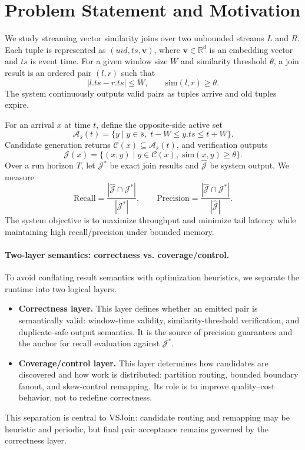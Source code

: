 \section{Problem Statement and Motivation}
\label{sec:problem-statement}

We study streaming vector similarity joins over two unbounded streams $L$ and $R$. Each tuple is represented as $(\mathit{uid}, \mathit{ts}, \mathbf{v})$, where $\mathbf{v} \in \mathbb{R}^d$ is an embedding vector and $\mathit{ts}$ is event time. For a given window size $W$ and similarity threshold $\theta$, a join result is an ordered pair $(l, r)$ such that
\[
|l.\mathit{ts} - r.\mathit{ts}| \leq W,
\qquad
\mathrm{sim}(l, r) \geq \theta.
\]
The system continuously outputs valid pairs as tuples arrive and old tuples expire.

For an arrival $x$ at time $t$, define the opposite-side active set
\[
\mathcal{A}_{\bar{s}}(t)=\{y \mid y\in \bar{s},\; t-W \leq y.\mathit{ts} \leq t+W\}.
\]
Candidate generation returns $\mathcal{C}(x)\subseteq\mathcal{A}_{\bar{s}}(t)$, and verification outputs
\[
\mathcal{J}(x)=\{(x,y)\mid y\in \mathcal{C}(x),\; \mathrm{sim}(x,y)\geq\theta\}.
\]
Over a run horizon $T$, let $\mathcal{J}^*$ be exact join results and $\widehat{\mathcal{J}}$ be system output. We measure
\[
\mathrm{Recall}=\frac{|\widehat{\mathcal{J}}\cap \mathcal{J}^*|}{|\mathcal{J}^*|},
\qquad
\mathrm{Precision}=\frac{|\widehat{\mathcal{J}}\cap \mathcal{J}^*|}{|\widehat{\mathcal{J}}|}.
\]
The system objective is to maximize throughput and minimize tail latency while maintaining high recall/precision under bounded memory.

\paragraph{Two-layer semantics: correctness vs. coverage/control.}
To avoid conflating result semantics with optimization heuristics, we separate the runtime into two logical layers.
\begin{itemize}
\item \textbf{Correctness layer.} This layer defines whether an emitted pair is semantically valid: window-time validity, similarity-threshold verification, and duplicate-safe output semantics. It is the source of precision guarantees and the anchor for recall evaluation against $\mathcal{J}^*$.
\item \textbf{Coverage/control layer.} This layer determines how candidates are discovered and how work is distributed: partition routing, bounded boundary fanout, and skew-control remapping. Its role is to improve quality--cost behavior, not to redefine correctness.
\end{itemize}
This separation is central to VSJoin: candidate routing and remapping may be heuristic and periodic, but final pair acceptance remains governed by the correctness layer.

